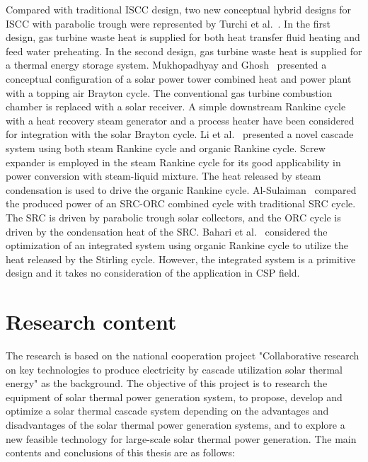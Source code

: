 Compared with traditional ISCC design, two new conceptual hybrid designs for ISCC with parabolic trough were represented by Turchi et al.~\cite{Turchi2014}. In the first design, gas turbine waste heat is supplied for both heat transfer fluid heating and feed water preheating. In the second design, gas turbine waste heat is supplied for a thermal energy storage system.
Mukhopadhyay and Ghosh~\cite{Mukhopadhyay2016} presented a conceptual configuration of a solar power tower combined heat and power plant with a topping air Brayton cycle. The conventional gas turbine combustion chamber is replaced with a solar receiver. A simple downstream Rankine cycle with a heat recovery steam generator and a process heater have been considered for integration with the solar Brayton cycle.
Li et al.~\cite{Li2016a} presented a novel cascade system using both steam Rankine cycle and organic Rankine cycle. Screw expander is employed in the steam Rankine cycle for its good applicability in power conversion with steam-liquid mixture. The heat released by steam condensation is used to drive the organic Rankine cycle.
Al-Sulaiman~\cite{AlSulaiman2014} compared the produced power of an SRC-ORC combined cycle with traditional SRC cycle. The SRC is driven by parabolic trough solar collectors, and the ORC cycle is driven by the condensation heat of the SRC.
Bahari et al.~\cite{Bahari2016} considered the optimization of an integrated system using organic Rankine cycle to utilize the heat released by the Stirling cycle. However, the integrated system is a primitive design and it takes no consideration of the application in CSP field.

\section{Research content}\label{sec:3}

The research is based on the national cooperation project "Collaborative research on key technologies to produce electricity by cascade utilization solar thermal energy" as the background. The objective of this project is to research the equipment of solar thermal power generation system, to propose, develop and optimize a solar thermal cascade system depending on the advantages and disadvantages of the solar thermal power generation systems, and to explore a new feasible technology for large-scale solar thermal power generation. The main contents and conclusions of this thesis are as follows:

